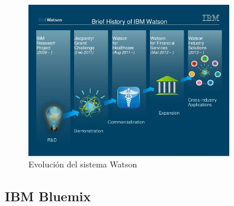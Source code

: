\documentclass[paper=a4, fontsize=10pt]{scrartcl} %
\numberwithin{equation}{section} %
\numberwithin{figure}{section} %
\numberwithin{table}{section} %
\begin{document}
\begin{figure}[H]
	\centering
	\label{watson2today}
	\includegraphics[trim = 0mm 14mm 0mm 10mm, clip, width=0.8\textwidth]{./Imagenes/watson2today.jpg}
	\caption{Evolución del sistema Watson \cite{watson-history}}
\end{figure}



\subsection{IBM Bluemix}
\end{document}
